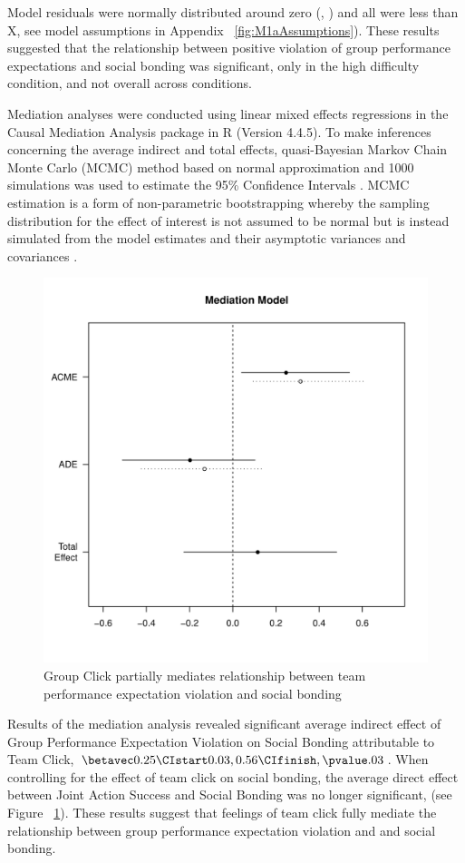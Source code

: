 Model residuals were normally distributed around zero (, ) and all \cooksD were less than X, see model assumptions in Appendix  ~\ref{fig:M1aAssumptions}).  These results suggested that the relationship between positive violation of group performance expectations and social bonding was significant, only in the high difficulty condition, and not overall across conditions.









Mediation analyses were conducted using linear mixed effects regressions in the Causal Mediation Analysis package in R (Version 4.4.5).  To make inferences concerning the average indirect and total effects, quasi-Bayesian Markov Chain Monte Carlo (MCMC) method based on normal approximation and 1000 simulations was used to estimate the 95\% Confidence Intervals \citep{Tofighi2016a,Imai2010}. MCMC estimation is a form of non-parametric bootstrapping whereby the sampling distribution for the effect of interest is not assumed to be normal but is instead simulated from the model estimates and their asymptotic variances and covariances \cite{Preacher2008}.

\begin{figure}
  \centering
  \includegraphics[width=0.5\linewidth,keepaspectratio] {images/groupPerfExpClickMediationPlotOffline}
  \caption{Group Click partially mediates relationship between team performance expectation violation and social bonding}
  \label{fig:groupPerfExpClickMediationPlot}
\end{figure}

Results of the mediation analysis revealed significant average indirect effect of Group Performance Expectation Violation on Social Bonding attributable to Team Click, $\betavec 0.25 \CIstart 0.03, 0.56 \CIfinish, \pvalue .03$. When controlling for the effect of team click on social bonding, the average direct effect between Joint Action Success and Social Bonding was no longer significant, (see Figure ~\ref{fig:groupPerfExpClickMediationPlot}).  These results suggest that feelings of team click fully mediate the relationship between group performance expectation violation and and social bonding.



